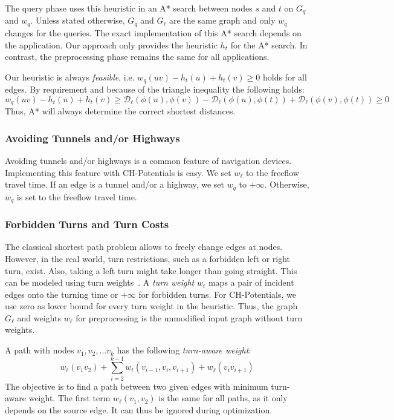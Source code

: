 \documentclass[a4paper,UKenglish,cleveref, autoref, thm-restate]{lipics-v2021}
\newcommand*{\dist}{\mathcal{D}}
\begin{document}
The query phase uses this heuristic in an A* search between nodes $s$ and $t$ on $G_q$ and $w_q$.
Unless stated otherwise, $G_q$ and $G_\ell$ are the same graph and only $w_q$ changes for the queries.
The exact implementation of this A* search depends on the application.
Our approach only provides the heuristic $h_t$ for the A* search.
In contrast, the preprocessing phase remains the same for all applications.

Our heuristic is always \emph{feasible}, i.e. $w_q(u v) - h_t(u) + h_t(v) \geq 0$ holds for all edges.
By requirement and because of the triangle inequality the following holds:
\[
w_q(u v) - h_t(u) + h_t(v) \geq \dist_\ell(\phi(u), \phi(v)) - \dist_\ell(\phi(u), \phi(t)) + \dist_\ell(\phi(v), \phi(t)) \geq 0
\]
Thus, A* will always determine the correct shortest distances.

\subsubsection{Avoiding Tunnels and/or Highways}
\label{sec:no-tunnel-highway}

Avoiding tunnels and/or highways is a common feature of navigation devices.
Implementing this feature with CH-Potentials is easy.
We set $w_\ell$ to the freeflow travel time.
If an edge is a tunnel and/or a highway, we set $w_q$ to $+\infty$.
Otherwise, $w_q$ is set to the freeflow travel time.

\subsubsection{Forbidden Turns and Turn Costs}
\label{sec:no-turns}

The classical shortest path problem allows to freely change edges at nodes.
However, in the real world, turn restrictions, such as a forbidden left or right turn, exist.
Also, taking a left turn might take longer than going straight.
This can be modeled using turn weights~\cite{gv-errnt-11,dgpw-crprn-13,bwzz-cchtc-20}.
A \emph{turn weight} $w_t$ maps a pair of incident edges onto the turning time or $+\infty$ for forbidden turns.
For CH-Potentials, we use zero as lower bound for every turn weight in the heuristic.
Thus, the graph $G_\ell$ and weights $w_\ell$ for preprocessing is the unmodified input graph without turn weights.

A path with nodes $v_1, v_2,\ldots v_k$ has the following \emph{turn-aware weight}: \[
w_\ell(v_1 v_2) + \sum_{i=2}^{k-1}  w_t(v_{i-1},v_i,v_{i+1}) + w_\ell(v_i v_{i+1})
\]
The objective is to find a path between two given edges with minimum turn-aware weight.
The first term $w_\ell(v_1, v_2)$ is the same for all paths, as it only depends on the source edge.
It can thus be ignored during optimization.
\end{document}
